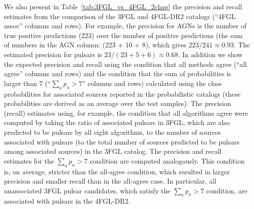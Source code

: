 \documentclass[referee]{aa} %
\begin{document}
We also present in Table~\ref{tab:3FGL_vs_4FGL_2class} the precision and recall estimates from the comparison of the 3FGL and 4FGL-DR2 catalogs (``4FGL assoc'' columns and rows).
For example, the precision for AGNs is the number of true positive predictions (223) over the number of positive predictions (the sum of numbers in the AGN column: (223 + 10 + 8), which gives $223 / 241 \approx 0.93$.
The estimated precision for pulsars is $ 23 / (23 + 5 + 6) \approx 0.68$.
In addition we show the expected precision and recall using the condition that all
methods agree (``all agree'' columns and rows) and the condition that the sum of probabilities is larger than 7 (``$\sum_a p_a > 7$'' columns and rows) calculated using the class probabilities for associated sources reported in the probabilistic catalogs (these probabilities are derived as an average over the test samples).
The precision (recall) estimates using, for example, the condition that all algorithms agree were computed by taking the ratio of associated pulsars in 3FGL, which are also predicted to be pulsars by all eight algorithms, to the number of sources associated with pulsars (to the total number of sources predicted to be pulsars among associated sources) in the 3FGL catalog.
The precision and recall estimates for the $\sum_a p_a > 7$ condition are computed analogously.
This condition is, on average, stricter than the all-agree condition, which resulted in larger precision and smaller recall than in the all-agree case.
In particular, all unassociated 3FGL pulsar candidates, which satisfy the $\sum_a p_a > 7$ condition, are associated with pulsars in the 4FGL-DR2.
\end{document}
